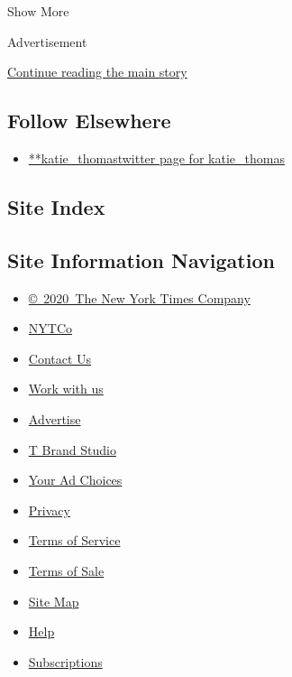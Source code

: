 Show More

Advertisement

\protect\hyperlink{after-mid2}{Continue reading the main story}

\hypertarget{follow-elsewhere}{%
\subsection{Follow Elsewhere}\label{follow-elsewhere}}

\begin{itemize}
\tightlist
\item
  \href{https://twitter.com/katie_thomas}{**katie\_thomastwitter page
  for katie\_thomas}
\end{itemize}

\hypertarget{site-index}{%
\subsection{Site Index}\label{site-index}}

\hypertarget{site-information-navigation}{%
\subsection{Site Information
Navigation}\label{site-information-navigation}}

\begin{itemize}
\tightlist
\item
  \href{https://help.nytimes3xbfgragh.onion/hc/en-us/articles/115014792127-Copyright-notice}{©~2020~The
  New York Times Company}
\end{itemize}

\begin{itemize}
\tightlist
\item
  \href{https://www.nytco.com/}{NYTCo}
\item
  \href{https://help.nytimes3xbfgragh.onion/hc/en-us/articles/115015385887-Contact-Us}{Contact
  Us}
\item
  \href{https://www.nytco.com/careers/}{Work with us}
\item
  \href{https://nytmediakit.com/}{Advertise}
\item
  \href{http://www.tbrandstudio.com/}{T Brand Studio}
\item
  \href{https://www.nytimes3xbfgragh.onion/privacy/cookie-policy\#how-do-i-manage-trackers}{Your
  Ad Choices}
\item
  \href{https://www.nytimes3xbfgragh.onion/privacy}{Privacy}
\item
  \href{https://help.nytimes3xbfgragh.onion/hc/en-us/articles/115014893428-Terms-of-service}{Terms
  of Service}
\item
  \href{https://help.nytimes3xbfgragh.onion/hc/en-us/articles/115014893968-Terms-of-sale}{Terms
  of Sale}
\item
  \href{https://spiderbites.nytimes3xbfgragh.onion}{Site Map}
\item
  \href{https://help.nytimes3xbfgragh.onion/hc/en-us}{Help}
\item
  \href{https://www.nytimes3xbfgragh.onion/subscription?campaignId=37WXW}{Subscriptions}
\end{itemize}
